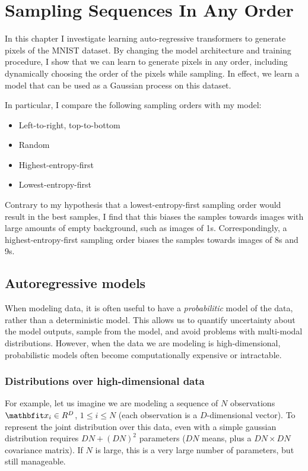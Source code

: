 \chapter{Sampling Sequences In Any Order}
\label{C:a-o-sampling}

In this chapter I investigate learning auto-regressive transformers to generate pixels of the MNIST dataset. By changing the model architecture and training procedure, I show that we can learn to generate pixels in any order, including dynamically choosing the order of the pixels while sampling. In effect, we learn a model that can be used as a Gaussian process on this dataset.

In particular, I compare the following sampling orders with my model:
\begin{itemize}
    \item Left-to-right, top-to-bottom
    \item Random
    \item Highest-entropy-first
    \item Lowest-entropy-first
\end{itemize}

Contrary to my hypothesis that a lowest-entropy-first sampling order would result in the best samples, I find that this biases the samples towards images with large amounts of empty background, such as images of 1s. Correspondingly, a highest-entropy-first sampling order biases the samples towards images of 8s and 9s.

\section{Autoregressive models}

When modeling data, it is often useful to have a \textit{probabilitic} model of the data, rather than a deterministic model. This allows us to quantify uncertainty about the model outputs, sample from the model, and avoid problems with multi-modal distributions. However, when the data we are modeling is high-dimensional, probabilistic models often become computationally expensive or intractable.


\subsection{Distributions over high-dimensional data}

For example, let us imagine we are modeling a sequence of $N$ observations $\x_i \in \R^D$, $1 ≤ i ≤ N$ (each observation is a $D$-dimensional vector). To represent the joint distribution over this data, even with a simple gaussian distribution requires $DN + (DN)^2$ parameters ($DN$ means, plus a $DN \times DN$ covariance matrix). If $N$ is large, this is a very large number of parameters, but still manageable.

